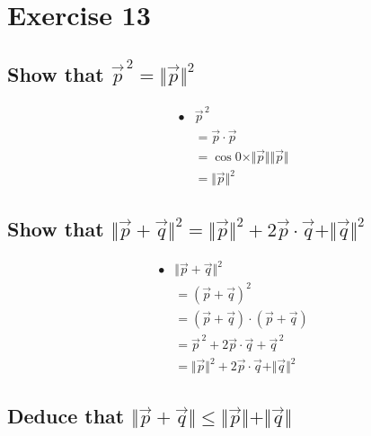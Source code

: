 \documentclass[12pt]{article}
\begin{document}
\section{
    Exercise 13
}
\subsection{
    Show that $\vec{p}^{\,2} = \Vert \vec{p} \Vert^2$
}

\begin{align*}
•
    &\vec{p}^{\,2} \\
    &= \vec{p} \cdot \vec{p} \\
    &= \cos{0} \times \Vert \vec{p} \Vert \Vert \vec{p} \Vert \\ 
    &= \Vert \vec{p} \Vert ^2
\end{align*}

\subsection{
    Show that $\Vert \vec{p} + \vec{q} \Vert^2 = \Vert \vec{p} \Vert^2 + 2 \vec{p} \cdot \vec{q} + \Vert \vec{q} \Vert^2$
}

\begin{align*}
•
    &\Vert \vec{p} + \vec{q} \Vert^2 \\
    &= (\vec{p} + \vec{q})^2 \\
    &= (\vec{p} + \vec{q}) \cdot (\vec{p} + \vec{q}) \\
    &= \vec{p}^{\,2} + 2 \vec{p} \cdot \vec{q} + \vec{q}^{\,2} \\
    &= \Vert \vec{p} \Vert^2 + 2 \vec{p} \cdot \vec{q} + \Vert \vec{q} \Vert^2
\end{align*}

\subsection{
    Deduce that $\Vert \vec{p} + \vec{q} \Vert \leq \Vert \vec{p} \Vert + \Vert \vec{q} \Vert$
}
\end{document}
